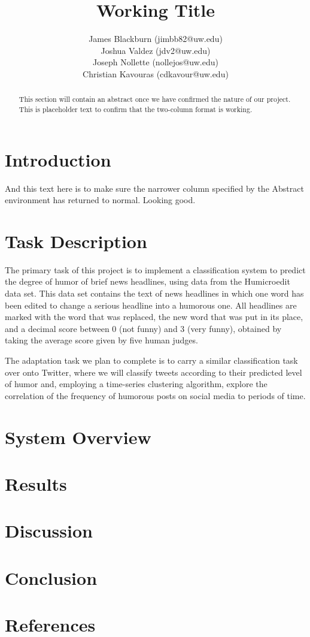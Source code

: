 \documentclass{article}
\title{Working Title}
\author{
James Blackburn (jimbb82@uw.edu)\\
Joshua Valdez (jdv2@uw.edu)\\
Joseph Nollette (nollejos@uw.edu)\\
Christian Kavouras (cdkavour@uw.edu)
}
\date{\vspace{-5ex}}
\begin{document}
\maketitle

\begin{abstract}
This section will contain an abstract once we have confirmed the nature of our project. This is placeholder text to confirm that the two-column format is working.
\end{abstract}

\section{Introduction}
And this text here is to make sure the narrower column specified by the Abstract environment has returned to normal. Looking good.

\section{Task Description}
The primary task of this project is to implement a classification system to predict the degree of humor of brief news headlines, using data from the Humicroedit data set. This data set contains the text of news headlines in which one word has been edited to change a serious headline into a humorous one. All headlines are marked with the word that was replaced, the new word that was put in its place, and a decimal score between 0 (not funny) and 3 (very funny), obtained by taking the average score given by five human judges.

The adaptation task we plan to complete is to carry a similar classification task over onto Twitter, where we will classify tweets according to their predicted level of humor and, employing a time-series clustering algorithm, explore the correlation of the frequency of humorous posts on social media to periods of time.

\section{System Overview}

\section{Results}

\section{Discussion}

\section{Conclusion}

\section{References}


\end{document}

